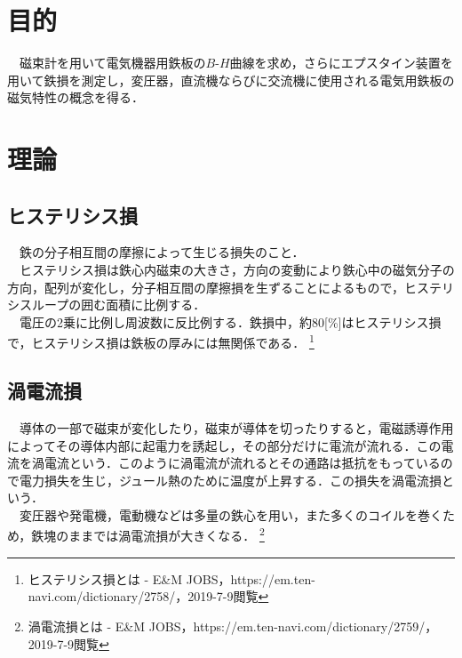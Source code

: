 

\pagestyle{fancy}
\section{目的}
　磁束計を用いて電気機器用鉄板の$B$-$H$曲線を求め，さらにエプスタイン装置を用いて鉄損を測定し，変圧器，直流機ならびに交流機に使用される電気用鉄板の磁気特性の概念を得る．\\

\section{理論}
\subsection{ヒステリシス損}
　鉄の分子相互間の摩擦によって生じる損失のこと．\\
　ヒステリシス損は鉄心内磁束の大きさ，方向の変動により鉄心中の磁気分子の方向，配列が変化し，分子相互間の摩擦損を生ずることによるもので，ヒステリシスループの囲む面積に比例する．\\
　電圧の2乗に比例し周波数に反比例する．鉄損中，約80[\%]はヒステリシス損で，ヒステリシス損は鉄板の厚みには無関係である．
\footnote{ヒステリシス損とは - E\&M JOBS，https://em.ten-navi.com/dictionary/2758/，2019-7-9閲覧}

\subsection{渦電流損}
　導体の一部で磁束が変化したり，磁束が導体を切ったりすると，電磁誘導作用によってその導体内部に起電力を誘起し，その部分だけに電流が流れる．この電流を渦電流という．このように渦電流が流れるとその通路は抵抗をもっているので電力損失を生じ，ジュール熱のために温度が上昇する．この損失を渦電流損という．\\
　変圧器や発電機，電動機などは多量の鉄心を用い，また多くのコイルを巻くため，鉄塊のままでは渦電流損が大きくなる．
\footnote{渦電流損とは - E\&M JOBS，https://em.ten-navi.com/dictionary/2759/，2019-7-9閲覧}

